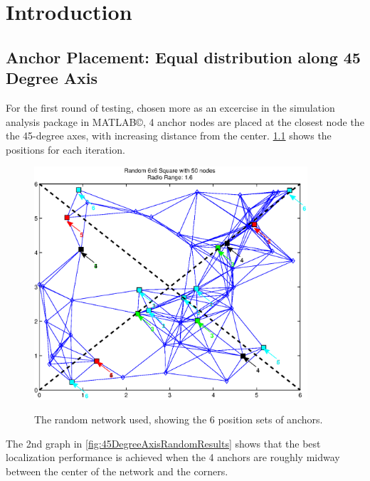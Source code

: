 \chapter{Introduction}

\section{Anchor Placement: Equal distribution along 45 Degree Axis}
For the first round of testing, chosen more as an excercise in the simulation analysis package in MATLAB\copyright, 4 anchor nodes are placed at the closest node the the 45-degree axes, with increasing distance from the center. \ref{fig:45DegreeAxisRandomNetwork} shows the positions for each iteration. 

\begin{figure}
  \centering
  \includegraphics[width=4in]{results/45DegreeAxis_Random/networkRandom6x6Squarewith50nodes1-6Radius.eps}\\
  \caption{The random network used, showing the 6 position sets of anchors.}
  \label{fig:45DegreeAxisRandomNetwork}
\end{figure}

The 2nd graph in \ref{fig:45DegreeAxisRandomResults} shows that the best localization performance is achieved when the 4 anchors are roughly midway between the center of the network and the corners.  

